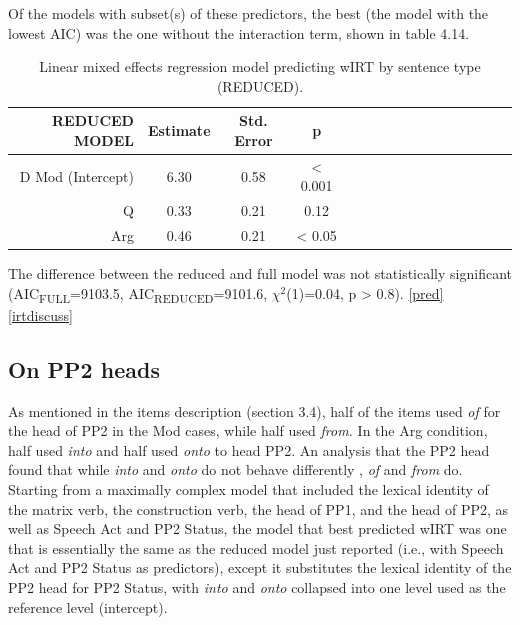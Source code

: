 \documentclass[12pt,oneside]{book}
\begin{document}
Of the models with subset(s) of these predictors, the best (the model with the lowest AIC) was the one without the interaction term, shown in table 4.14.

\begin{table}[!h]

\caption{\label{tab:redirt}Linear mixed effects regression model predicting wIRT by sentence type (REDUCED).}
\centering
\begin{tabular}{rcccrcccrcccrccc}
\toprule
REDUCED MODEL & Estimate & Std. Error & p\\
\midrule
D Mod (Intercept) & 6.30 & 0.58 & < 0.001\\
Q & 0.33 & 0.21 & 0.12\\
Arg & 0.46 & 0.21 & < 0.05\\
\bottomrule
\end{tabular}
\end{table}

The difference between the reduced and full model was not statistically significant (AIC\textsubscript{FULL}=9103.5, AIC\textsubscript{REDUCED}=9101.6, \(\chi^2\)(1)=0.04, p \textgreater{} 0.8).  \ref{pred} \ref{irtdiscuss} 

\hypertarget{pp2h}{%
\subsection{On PP2 heads}\label{pp2h}}

As mentioned in the items description (section 3.4), half of the items used \emph{of} for the head of PP2 in the Mod cases, while half used \emph{from.} In the Arg condition, half used \emph{into} and half used \emph{onto} to head PP2. An analysis that  the PP2 head  found that while \emph{into} and \emph{onto} do not behave differently , \emph{of} and \emph{from} do. Starting from a maximally complex model that included the lexical identity of the matrix verb, the construction verb, the head of PP1, and the head of PP2, as well as Speech Act and PP2 Status, the model that best predicted wIRT was one that is essentially the same as the reduced model just reported (i.e., with Speech Act and PP2 Status as predictors), except  it substitutes the lexical identity of the PP2 head for PP2 Status, with \emph{into} and \emph{onto} collapsed into one level used as the reference level (intercept).
\end{document}

